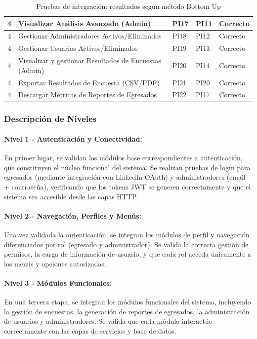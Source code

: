 \begin{table}[H]
{\begin{tabular}{|c|l|l|l|l|}
4 & Visualizar Análisis Avanzado (Admin) & PI17 & PI11 & Correcto \\ \hline
4 & Gestionar Administradores Activos/Eliminados & PI18 & PI12 & Correcto \\ \hline
4 & Gestionar Usuarios Activos/Eliminados & PI19 & PI13 & Correcto \\ \hline
4 & Visualizar y gestionar Resultados de Encuestas (Admin) & PI20 & PI14 & Correcto \\ \hline
4 & Exportar Resultados de Encuesta (CSV/PDF) & PI21 & PI20 & Correcto \\ \hline
4 & Descargar Métricas de Reportes de Egresados & PI22 & PI17 & Correcto \\ \hline
\end{tabular}
}
\caption{Pruebas de integración: resultados según método Bottom Up}
\label{tab:pruebas_integracion_bottomup}
\end{table}

\subsubsection{Descripción de Niveles}

\paragraph{Nivel 1 - Autenticación y Conectividad:}
En primer lugar, se validan los módulos base correspondientes a autenticación, que constituyen el núcleo funcional del sistema. Se realizan pruebas de login para egresados (mediante integración con LinkedIn OAuth) y administradores (email + contraseña), verificando que los tokens JWT se generen correctamente y que el sistema sea accesible desde las capas HTTP.

\paragraph{Nivel 2 - Navegación, Perfiles y Menús:}
Una vez validada la autenticación, se integran los módulos de perfil y navegación diferenciados por rol (egresado y administrador). Se valida la correcta gestión de permisos, la carga de información de usuario, y que cada rol acceda únicamente a los menús y opciones autorizadas.

\paragraph{Nivel 3 - Módulos Funcionales:}
En una tercera etapa, se integran los módulos funcionales del sistema, incluyendo la gestión de encuestas, la generación de reportes de egresados, la administración de usuarios y administradores. Se valida que cada módulo interactúe correctamente con las capas de servicios y base de datos.

